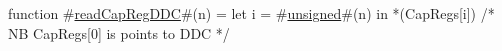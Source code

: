 function #\hyperref[sailMIPSzreadCapRegDDC]{readCapRegDDC}#(n) =
  let i = #\hyperref[sailMIPSzunsigned]{unsigned}#(n) in
  *(CapRegs[i]) /* NB CapRegs[0] is points to DDC */
